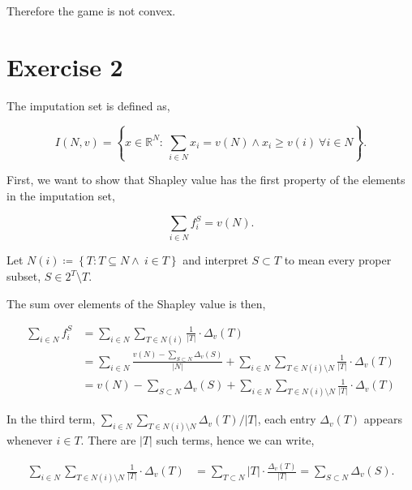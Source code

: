 \documentclass[american]{scrartcl}
\newcommand{\set}[1]{\left\{#1\right\}}
\newcommand{\Real}{\mathbb{R}}
\newcommand{\abs}[1]{\left\lvert #1 \right\rvert}
\begin{document}
Therefore the game is not convex.

\section*{Exercise 2}

The imputation set is defined as,

\begin{equation}
    I(N, v) = \set{ x \in \Real^N: \ \sum_{i \in N} x_i = v(N) \land x_i \geq v(i) \ \forall i \in N }.
\end{equation}



First, we want to show that Shapley value has the first property of the elements in the imputation set,

\begin{equation}
    \sum_{i \in N} f_i^S = v(N).
\end{equation}


Let $N(i) \coloneqq \set{T: T \subseteq N \land \ i \in T}$ and interpret $S \subset T$ to mean every proper subset, $S \in 2^T \setminus T$.

The sum over elements of the Shapley value is then,

\begin{equation} \label{shap_sum_int}
    \begin{split}
        \sum_{i \in N} f_i^S &= \sum_{i \in N} \sum_{T \in N(i)} \frac{1}{\abs{T}} \cdot \Delta_v(T)\\
        &= \sum_{i \in N} \frac{v(N) - \sum_{S \subset N}\Delta_v(S)}{\abs{N}} + \sum_{i \in N} \sum_{T \in N(i) \setminus N} \frac{1}{\abs{T}} \cdot \Delta_v(T) \\
        &= v(N) - \sum_{S \subset N} \Delta_v(S)+ \sum_{i \in N} \sum_{T \in N(i) \setminus N} \frac{1}{\abs{T}} \cdot \Delta_v(T)
    \end{split}
\end{equation}

In the third term, $\sum_{i \in N} \sum_{T \in N(i) \setminus N} \Delta_v(T) / \abs{T}$, each entry $\Delta_v(T)$ appears whenever $i \in T$. There are $\abs{T}$ such terms, hence we can write,


\begin{equation}
    \begin{split}
        \sum_{i \in N} \sum_{T \in N(i) \setminus N} \frac{1}{\abs{T}} \cdot \Delta_v(T) &= \sum_{T \subset N} \abs{T} \cdot \frac{\Delta_v(T)}{\abs{T}} = \sum_{S \subset N} \Delta_v(S).
    \end{split}
\end{equation}
\end{document}
